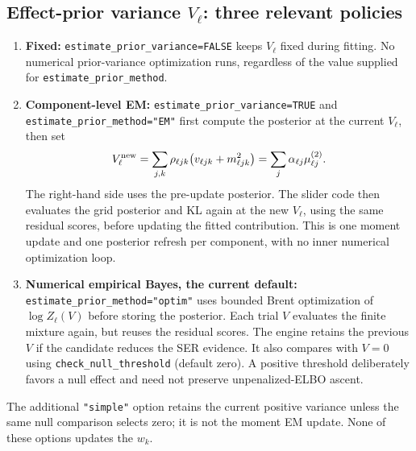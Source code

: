 \documentclass[11pt]{article}
\begin{document}
\subsection{Effect-prior variance $V_\ell$: three relevant policies}
\begin{enumerate}
 \item \textbf{Fixed:} \texttt{estimate\_prior\_variance=FALSE} keeps
 $V_\ell$ fixed during fitting. No numerical prior-variance optimization
 runs, regardless of the value supplied for \texttt{estimate\_prior\_method}.
 \item \textbf{Component-level EM:}
 \texttt{estimate\_prior\_variance=TRUE} and
 \texttt{estimate\_prior\_method="EM"} first compute the posterior at the
 current $V_\ell$, then set
 \begin{equation}
 V_\ell^{\rm new}=\sum_{j,k}\rho_{\ell jk}
       \bigl(v_{\ell jk}+m_{\ell jk}^2\bigr)
       =\sum_j\alpha_{\ell j}\mu^{(2)}_{\ell j}.
 \label{eq:Vupdate}
 \end{equation}
 The right-hand side uses the pre-update posterior. The slider code
 then evaluates the grid posterior and KL again at the new $V_\ell$,
 using the same residual scores, before updating the fitted contribution.
 This is one moment update and one posterior refresh per component,
 with no inner numerical optimization loop.
 \item \textbf{Numerical empirical Bayes, the current default:}
 \texttt{estimate\_prior\_method="optim"} uses bounded Brent optimization
 of $\log Z_\ell(V)$ before storing the posterior. Each trial $V$ evaluates
 the finite mixture again, but reuses the residual scores. The engine
 retains the previous $V$ if the candidate reduces the SER evidence.
 It also compares with $V=0$ using \texttt{check\_null\_threshold}
 (default zero). A positive threshold deliberately favors a null effect
 and need not preserve unpenalized-ELBO ascent.
\end{enumerate}
The additional \texttt{"simple"} option retains the current positive
variance unless the same null comparison selects zero; it is not the
moment EM update. None of these options updates the $w_k$.
\end{document}
